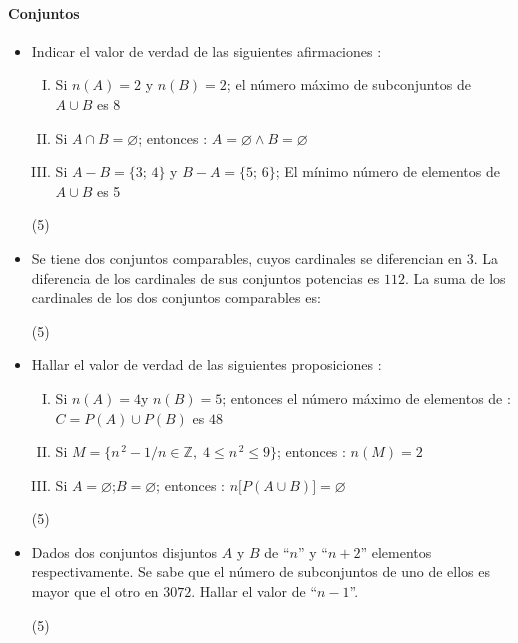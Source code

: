 \documentclass[10pt, twocolumn, landscape, a4paper]{article}
\begin{document}
\paragraph*{Conjuntos}

\begin{itemize}
\item{Indicar el valor de verdad de las siguientes afirmaciones :
\begin{enumerate}[I.]
	\item{Si $n(A) = 2$ y $n(B) = 2$; el número máximo de subconjuntos de $A \cup B$ es 8}
	\item{Si $A \cap B = \varnothing$; entonces : $A = \varnothing \wedge B = \varnothing$}
	\item{Si $A - B = \{3;\,4\}$ y $B - A = \{5;\,6\}$; El mínimo número de elementos de \\ $A \cup B$ es 5}
\end{enumerate}

\begin{tasks}(5)
\end{tasks}}
\item{Se tiene dos conjuntos comparables, cuyos cardinales se diferencian en $3$. La diferencia de los cardinales de sus conjuntos potencias es $112$. La suma de los cardinales de los dos conjuntos comparables es:
\begin{tasks}(5)
\end{tasks}}
\item{Hallar el valor de verdad de las siguientes proposiciones : 
\begin{enumerate}[I.]
\item{Si $n(A) = 4$\quad y \quad$n(B) = 5$; entonces el número máximo de elementos de : \\ $C = P(A) \cup P(B)$ es $48$}
\item{Si $M = \{n^{\,2} - 1 / n \in \mathbb{Z},\; 4 \leq n^{\,2} \leq 9\}$; entonces : $n(M) = 2$}
\item{Si $A = \varnothing$;\quad $B = \varnothing$; entonces : $n\Big[P(A \cup B)\Big] = \varnothing$}
\end{enumerate}

\begin{tasks}(5)
\end{tasks}
}
\item{Dados dos conjuntos disjuntos $A$ y $B$ de ``$n$'' y ``$n + 2$'' elementos respectivamente. Se sabe que el número de subconjuntos de uno de ellos es mayor que el otro en $3072$. Hallar el valor de ``$n - 1$''.
\begin{tasks}(5)
\end{tasks}}


\end{itemize}
\end{document}
